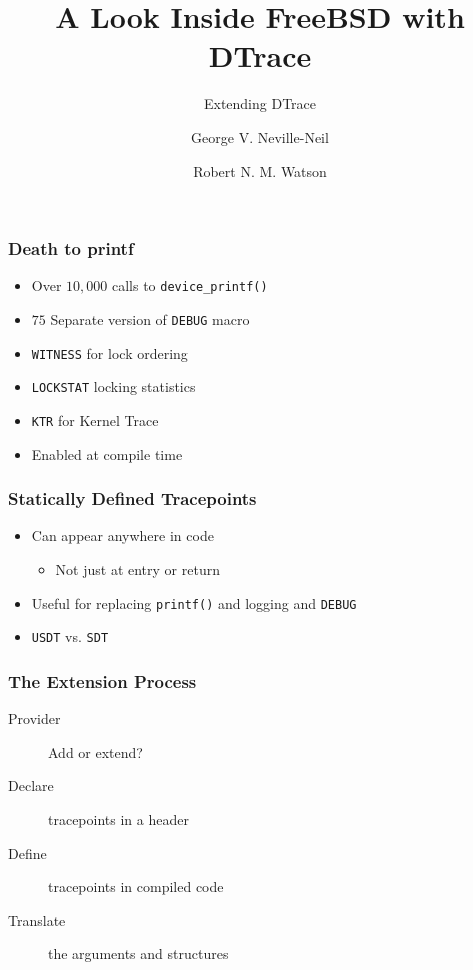 \documentclass[pdftex]{beamer}
\begin{document}

\title{A Look Inside FreeBSD with DTrace}
\subtitle{Extending DTrace}
\author[shortname]{George V. Neville-Neil \and Robert N. M. Watson}

\begin{frame}
  \titlepage
\end{frame}

\begin{frame}[fragile]
  \frametitle{Death to printf}
  \begin{itemize}
  \item Over $10,000$ calls to \verb|device_printf()|
  \item $75$ Separate version of \verb|DEBUG| macro
  \item \verb|WITNESS| for lock ordering
  \item \verb|LOCKSTAT| locking statistics
  \item \verb|KTR| for Kernel Trace
  \item Enabled at compile time
  \end{itemize}
\end{frame}

\begin{frame}[fragile]
  \frametitle{Statically Defined Tracepoints}
  \begin{itemize}
  \item Can appear anywhere in code 
    \begin{itemize}
    \item Not just at entry or return
    \end{itemize}
  \item Useful for replacing \verb|printf()| and logging and \verb|DEBUG|
  \item \verb|USDT| vs. \verb|SDT|
  \end{itemize}
\end{frame}

\begin{frame}
  \frametitle{The Extension Process}
  \begin{description}
  \item [Provider] Add or extend? 
  \item [Declare] tracepoints in a header
  \item [Define] tracepoints in compiled code 
  \item [Translate] the arguments and structures
  \end{description}
\end{frame}
\end{document}
